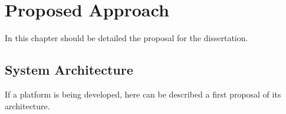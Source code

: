 \chapter{Proposed Approach}\label{proposal}

In this chapter should be detailed the proposal for the dissertation.

\section{System Architecture}

If a platform is being developed, here can be described a first proposal of its architecture.